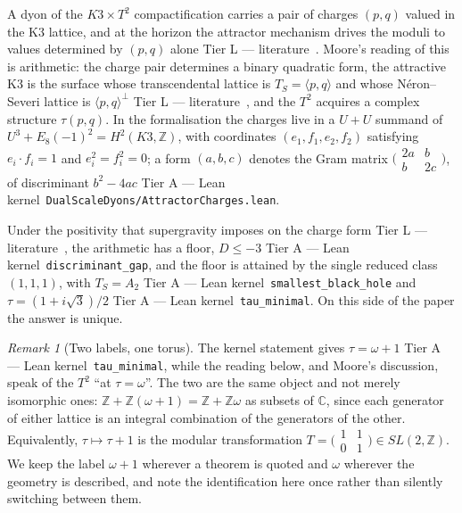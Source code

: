 \documentclass[11pt,a4paper]{article}
\theoremstyle{remark}
\newtheorem{remark}[theorem]{Remark}
\newcommand{\tierA}{\colorbox{green!15}{\textsf{\scriptsize Tier A --- Lean kernel}}}
\newcommand{\tierL}{\colorbox{blue!10}{\textsf{\scriptsize Tier L --- literature}}}
\newcommand{\lean}[1]{\texttt{#1}}
\begin{document}
A dyon of the $K3\times T^2$ compactification carries a pair of charges $(p,q)$ valued in the K3 lattice, and at the horizon the attractor mechanism drives the moduli to values determined by $(p,q)$ alone \tierL\ \cite[(4.4a)--(4.6), ll.~1356--1376]{Moore1998}. Moore's reading of this is arithmetic: the charge pair determines a binary quadratic form, the attractive K3 is the surface whose transcendental lattice is $T_S=\langle p,q\rangle$ and whose N\'eron--Severi lattice is $\langle p,q\rangle^{\perp}$ \tierL\ \cite[(4.8), ll.~1404--1409]{Moore1998}, and the $T^2$ acquires a complex structure $\tau(p,q)$. In the formalisation the charges live in a $U+U$ summand of $U^3+E_8(-1)^2=H^2(K3,\mathbb{Z})$, with coordinates $(e_1,f_1,e_2,f_2)$ satisfying $e_i\cdot f_i=1$ and $e_i^2=f_i^2=0$; a form $(a,b,c)$ denotes the Gram matrix $\bigl(\begin{smallmatrix}2a&b\\b&2c\end{smallmatrix}\bigr)$, of discriminant $b^2-4ac$ \tierA\ \lean{DualScaleDyons/AttractorCharges.lean}.

\begin{headlinebox}
Under the positivity that supergravity imposes on the charge form \tierL\ \cite[(3.4)--(3.5), ll.~1104--1112]{Moore1998}, the arithmetic has a floor, $D\le-3$ \tierA\ \lean{discriminant\_gap}, and the floor is attained by the single reduced class $(1,1,1)$, with $T_S=A_2$ \tierA\ \lean{smallest\_black\_hole} and $\tau=(1+i\sqrt3)/2$ \tierA\ \lean{tau\_minimal}. On this side of the paper the answer is unique.
\end{headlinebox}


\begin{remark}[Two labels, one torus]
\label{rem:tau}
The kernel statement gives $\tau=\omega+1$ \tierA\ \lean{tau\_minimal}, while the reading below, and Moore's
discussion, speak of the $T^2$ ``at $\tau=\omega$''. The two are the same object and not merely isomorphic ones:
$\mathbb{Z}+\mathbb{Z}(\omega+1)=\mathbb{Z}+\mathbb{Z}\omega$ as subsets of $\mathbb{C}$, since each generator of
either lattice is an integral combination of the generators of the other. Equivalently, $\tau\mapsto\tau+1$ is
the modular transformation $T=\bigl(\begin{smallmatrix}1&1\\0&1\end{smallmatrix}\bigr)\in SL(2,\mathbb{Z})$. We
keep the label $\omega+1$ wherever a theorem is quoted and $\omega$ wherever the geometry is described, and note
the identification here once rather than silently switching between them.
\end{remark}
\end{document}
